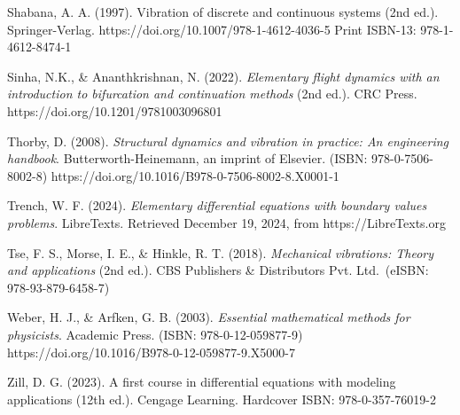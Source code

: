 \documentclass[
  11pt,
]{article}
\begin{document}
Shabana, A. A. (1997). Vibration of discrete and continuous systems (2nd
ed.). Springer-Verlag. https://doi.org/10.1007/978-1-4612-4036-5 Print
ISBN-13: 978-1-4612-8474-1

Sinha, N.K., \& Ananthkrishnan, N. (2022). \emph{Elementary flight
dynamics with an introduction to bifurcation and continuation methods}
(2nd ed.). CRC Press. https://doi.org/10.1201/9781003096801

Thorby, D. (2008). \emph{Structural dynamics and vibration in practice:
An engineering handbook}. Butterworth-Heinemann, an imprint of Elsevier.
(ISBN: 978-0-7506-8002-8)
https://doi.org/10.1016/B978-0-7506-8002-8.X0001-1

Trench, W. F. (2024). \emph{Elementary differential equations with
boundary values problems}. LibreTexts. Retrieved December 19, 2024, from
https://LibreTexts.org

Tse, F. S., Morse, I. E., \& Hinkle, R. T. (2018). \emph{Mechanical
vibrations: Theory and applications} (2nd ed.). CBS Publishers \&
Distributors Pvt. Ltd.~(eISBN: 978-93-879-6458-7)

Weber, H. J., \& Arfken, G. B. (2003). \emph{Essential mathematical
methods for physicists}. Academic Press. (ISBN: 978-0-12-059877-9)
https://doi.org/10.1016/B978-0-12-059877-9.X5000-7

Zill, D. G. (2023). A first course in differential equations with
modeling applications (12th ed.). Cengage Learning. Hardcover ISBN:
978-0-357-76019-2
\end{document}

